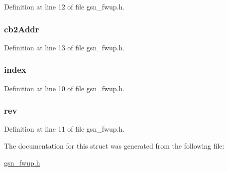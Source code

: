 Definition at line 12 of file gsn\_\-fwup.h.

\hypertarget{a00027_a11b562d4667b6205be4e6bd3abba3066}{
\subsubsection[{cb2Addr}]{ {\bf cb2Addr}}}
\label{a00027_a11b562d4667b6205be4e6bd3abba3066}


Definition at line 13 of file gsn\_\-fwup.h.

\hypertarget{a00027_a02f6db92126361e55e3b4780f6b337ae}{
\subsubsection[{index}]{ {\bf index}}}
\label{a00027_a02f6db92126361e55e3b4780f6b337ae}


Definition at line 10 of file gsn\_\-fwup.h.

\hypertarget{a00027_ab826479c6d1f61fb77c9c256182563df}{
\subsubsection[{rev}]{ {\bf rev}}}
\label{a00027_ab826479c6d1f61fb77c9c256182563df}


Definition at line 11 of file gsn\_\-fwup.h.



The documentation for this struct was generated from the following file:\begin{DoxyCompactItemize}
\item 
\hyperlink{a00502}{gsn\_\-fwup.h}\end{DoxyCompactItemize}
